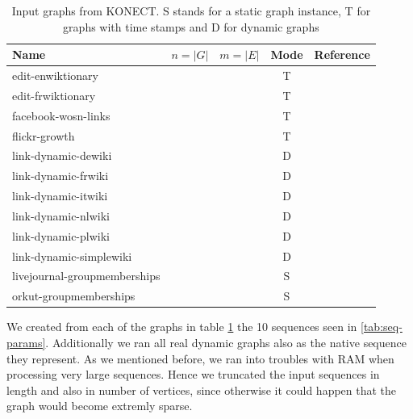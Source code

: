 \documentclass{article}      %
\begin{document}
\begin{table}
  \centering
    \begin{tabular}{| l | c | c | c | c |}
    	\hline
    	Name & $n = |G|$ & $m = |E|$ & Mode & Reference \\
    	\hline
    	edit-enwiktionary & & & T & \\
    	edit-frwiktionary & & & T & \\
    	facebook-wosn-links & & & T & \\
    	flickr-growth & & & T & \\
    	link-dynamic-dewiki & & & D & \\
    	link-dynamic-frwiki & & & D & \\
    	link-dynamic-itwiki & & & D & \\
    	link-dynamic-nlwiki & & & D & \\
    	link-dynamic-plwiki & & & D & \\
    	link-dynamic-simplewiki & & & D & \\
    	livejournal-groupmemberships & & & S & \\
    	orkut-groupmemberships & & & S & \\
    	\hline
    \end{tabular}
  \caption{Input graphs from KONECT. S stands for a static graph instance, T for graphs with time stamps and D for dynamic graphs}
  \label{tab:graphs}
\end{table}

We created from each of the graphs in table \ref{tab:graphs} the 10 sequences seen in \ref{tab:seq-params}. Additionally we ran all real dynamic graphs also as the native sequence they represent. As we mentioned before, we ran into troubles with RAM when processing very large sequences. Hence we truncated the input sequences in length and also in number of vertices, since otherwise it could happen that the graph would become extremly sparse. 
\end{document}
